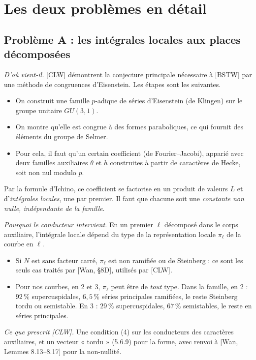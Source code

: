 \documentclass[11pt]{amsart}
\begin{document}
\section{Les deux problèmes en détail}

\subsection*{Problème A : les intégrales locales aux places décomposées}
\emph{D'où vient-il.} [CLW] démontrent la conjecture principale nécessaire à [BSTW] par une méthode de congruences d'Eisenstein. Les étapes sont les suivantes.
\begin{itemize}
\item On construit une famille $p$-adique de séries d'Eisenstein (de Klingen) sur le groupe unitaire $GU(3,1)$.
\item On montre qu'elle est congrue à des formes paraboliques, ce qui fournit des éléments du groupe de Selmer.
\item Pour cela, il faut qu'un certain coefficient (de Fourier--Jacobi), apparié avec deux familles auxiliaires $\theta$ et $h$ construites à partir de caractères de Hecke, soit non nul modulo $p$.
\end{itemize}
Par la formule d'Ichino, ce coefficient se factorise en un produit de valeurs $L$ et d'\emph{intégrales locales}, une par premier. Il faut que chacune soit une \emph{constante non nulle, indépendante de la famille}.

\emph{Pourquoi le conducteur intervient.} En un premier $\ell$ décomposé dans le corps auxiliaire, l'intégrale locale dépend du type de la représentation locale $\pi_\ell$ de la courbe en $\ell$.
\begin{itemize}
\item Si $N$ est sans facteur carré, $\pi_\ell$ est non ramifiée ou de Steinberg : ce sont les seuls cas traités par [Wan, \S8D], utilisés par [CLW].
\item Pour nos courbes, en $2$ et $3$, $\pi_\ell$ peut être de \emph{tout} type. Dans la famille, en $2$ : $92\,\%$ supercuspidales, $6{,}5\,\%$ séries principales ramifiées, le reste Steinberg tordu ou semistable. En $3$ : $29\,\%$ supercuspidales, $67\,\%$ semistables, le reste en séries principales.
\end{itemize}

\emph{Ce que prescrit [CLW].} Une condition (4) sur les conducteurs des caractères auxiliaires, et un vecteur « tordu » (5.6.9) pour la forme, avec renvoi à [Wan, Lemmes 8.13--8.17] pour la non-nullité.
\end{document}
